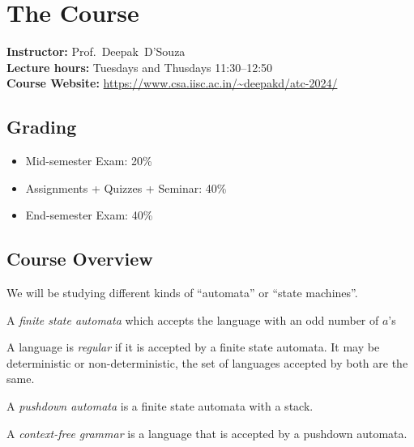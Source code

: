 \setcounter{chapter}{-1}
\chapter{The Course}

\textbf{Instructor:} Prof.~Deepak~D'Souza\\
\textbf{Lecture hours:} Tuesdays and Thusdays 11:30--12:50\\
\textbf{Course Website:} \url{https://www.csa.iisc.ac.in/~deepakd/atc-2024/}

\section*{Grading}
\begin{itemize}
    \item Mid-semester Exam: 20\%
    \item Assignments + Quizzes + Seminar: 40\%
    \item End-semester Exam: 40\%
\end{itemize}

\section*{Course Overview}
We will be studying different kinds of ``automata'' or ``state machines''.

A \emph{finite state automata} which accepts the language with an odd
number of $a$'s
\begin{center}
\end{center}

A language is \emph{regular} if it is accepted by a finite state automata.
It may be deterministic or non-deterministic, the set of languages accepted
by both are the same.

A \emph{pushdown automata} is a finite state automata with a stack.

A \emph{context-free grammar} is a language that is accepted by a pushdown
automata.
